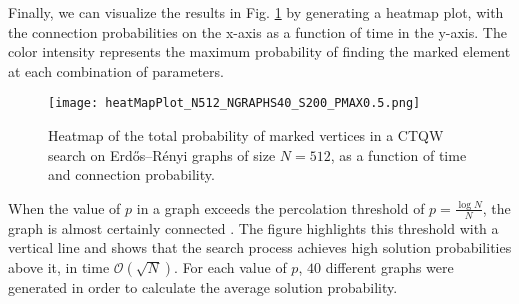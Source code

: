 \documentclass[main.tex]{subfiles}
\begin{document}
Finally, we can visualize the results in Fig. \ref{fig:ERSearch} by
generating a heatmap plot, with the connection probabilities on the x-axis as a
function of time in the y-axis. The color intensity represents the
maximum probability of finding the marked element at each combination of
parameters.

\begin{figure}[!h]
    \centering
    \texttt{[image: heatMapPlot\_N512\_NGRAPHS40\_S200\_PMAX0.5.png]}
    \caption{Heatmap of the total probability of marked vertices in a CTQW search on
    Erdős–Rényi graphs of size $N=512$, as a function of time and connection probability.}
    \label{fig:ERSearch}
\end{figure}

When the value of $p$ in a graph exceeds the percolation threshold of
$p=\frac{\log{N}}{N}$, the graph is almost certainly connected
\cite{chakraborty2016}.  The figure highlights this threshold with a vertical
line and shows that the search process achieves high solution probabilities
above it, in time $\mathcal{O}(\sqrt{N})$. For each value of $p$, $40$
different graphs were generated in order to calculate the average solution
probability.
\end{document}
